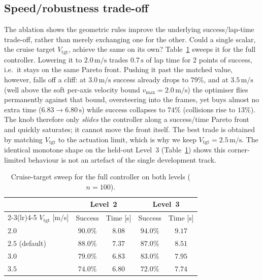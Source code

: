 \documentclass[conference]{IEEEtran}
\begin{document}
\subsection{Speed/robustness trade-off}
The ablation shows the geometric rules improve the underlying success/lap-time
trade-off, rather than merely exchanging one for the other. Could a single scalar,
the cruise target $V_{\mathrm{tgt}}$, achieve the same on its own?
Table~\ref{tab:sweep} sweeps it for the full
controller. Lowering it to $2.0\,\mathrm{m/s}$ trades $0.7\,\mathrm{s}$ of lap
time for $2$ points of success, i.e.\ it stays on the same Pareto front. Pushing
it past the matched value, however, falls off a cliff: at $3.0\,\mathrm{m/s}$
success already drops to $79\%$, and at $3.5\,\mathrm{m/s}$ (well above the soft
per-axis velocity bound $v_{\max}=2.0\,\mathrm{m/s}$) the optimiser flies
permanently against that bound, oversteering into the frames, yet buys almost no
extra time ($6.83\!\to\!6.80\,\mathrm{s}$) while success collapses to $74\%$
(collisions rise to $13\%$). The knob therefore only \emph{slides} the controller
along a success/time Pareto front and quickly saturates; it cannot move the front
itself. The best trade is obtained by matching $V_{\mathrm{tgt}}$ to the
actuation limit, which is why we keep $V_{\mathrm{tgt}}=2.5\,\mathrm{m/s}$. The
identical monotone shape on the held-out Level~3 (Table~\ref{tab:sweep}) shows
this corner-limited behaviour is not an artefact of the single development track.

\begin{table}[t]
\centering
\caption{Cruise-target sweep for the full controller on both levels ($n=100$).}
\label{tab:sweep}
\begin{tabular}{lcccc}
\toprule
& \multicolumn{2}{c}{Level~2} & \multicolumn{2}{c}{Level~3}\\
\cmidrule(lr){2-3}\cmidrule(lr){4-5}
$V_{\mathrm{tgt}}$ [m/s] & Success & Time [s] & Success & Time [s]\\
\midrule
$2.0$ & $90.0\%$ & $8.08$ & $94.0\%$ & $9.17$\\
$2.5$ (default) & $88.0\%$ & $7.37$ & $87.0\%$ & $8.51$\\
$3.0$ & $79.0\%$ & $6.83$ & $83.0\%$ & $7.95$\\
$3.5$ & $74.0\%$ & $6.80$ & $72.0\%$ & $7.74$\\
\bottomrule
\end{tabular}
\end{table}
\end{document}
